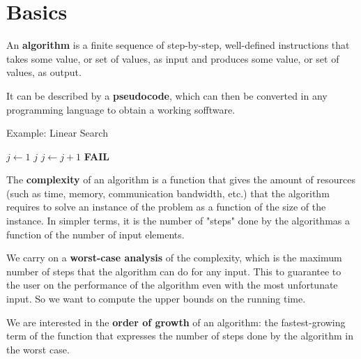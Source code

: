
\chapter{Basics}

\begin{definitionblock}[Algorithm]
    An \textbf{algorithm} is a finite sequence of step-by-step, well-defined instructions that takes some value, or set of values, as input and produces some value, or set of values, as output.
\end{definitionblock}

It can be described by a \textbf{pseudocode}, which can then be converted in any programming language to obtain a working sofftware.

\begin{algorithm}
    \caption{Example: Linear Search}
    \begin{algorithmic}[1]
        \State $j \gets 1$ 
         
                \State \Return $j$ 
            \EndIf
            \State $j \gets j + 1$
        \EndWhile
         
            \State \Return \textbf{FAIL} 
        \EndIf
    \end{algorithmic}
\end{algorithm}

\begin{definitionblock}[Complexity]
    The \textbf{complexity} of an algorithm is a function that gives the amount of resources (such as time, memory, communication bandwidth, etc.) that the algorithm requires to solve an instance of the problem as a function of the size of the instance.
    In simpler terms, it is the number of "steps" done by the algorithmas a function of the number of input elements.
\end{definitionblock}

We carry on a \textbf{worst-case analysis} of the complexity, which is the maximum number of steps that the algorithm can do for any input. This to guarantee to the user on the performance of the algorithm even with the most unfortunate input. So we want to compute the upper bounds on the running time.

We are interested in the \textbf{order of growth} of an algorithm: the fastest-growing term of the function that expresses the number of steps done by the algorithm in the worst case.

